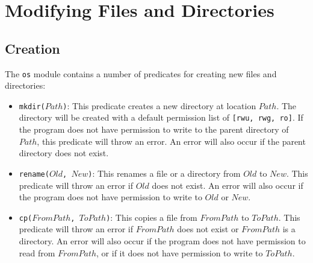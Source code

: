 \section{Modifying Files and Directories}

\subsection{Creation}
The \texttt{os} module contains a number of predicates for creating new files and directories:
\begin{itemize}
\item \texttt{mkdir($Path$)}: This predicate creates a new directory at location $Path$.  The directory will be created with a default permission list of \texttt{[rwu, rwg, ro]}.  If the program does not have permission to write to the parent directory of $Path$, this predicate will throw an error.  An error will also occur if the parent directory does not exist.  

\item \texttt{rename($Old$, $New$)}: This renames a file or a directory from $Old$ to $New$.  This predicate will throw an error if $Old$ does not exist.  An error will also occur if the program does not have permission to write to $Old$ or $New$.

\item \texttt{cp($FromPath$, $ToPath$)}: This copies a file from $FromPath$ to $ToPath$.  This predicate will throw an error if $FromPath$ does not exist or $FromPath$ is a directory.  An error will also occur if the program does not have permission to read from $FromPath$, or if it does not have permission to write to $ToPath$.

\end{itemize}

